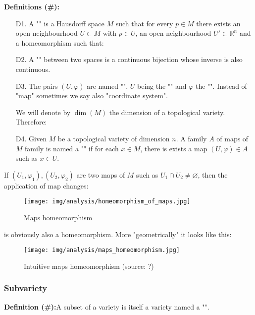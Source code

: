 	\textbf{Definitions (\#\mydef):}
	\begin{enumerate}
		\item[D1.] A "" is a Hausdorff space $M$ such that for every $p\in M$ there exists an open neighbourhood $U\subset M$ with $p\in U$, an open neighbourhood $U' \subset \mathbb{R}^n$ and a homeomorphism such that:
		
		\item[D2.] A "" between two spaces is a continuous bijection whose inverse is also continuous.

		\item[D3.] The pairs $(U,\varphi)$ are named "", $U$ being the "" and $\varphi$ the "". Instead of "map" sometimes we say also "coordinate system".

		\begin{tcolorbox}[title=Remark,colframe=black,arc=10pt]
		We will denote by $\dim(M)$ the dimension of a topological variety. Therefore:
		
		\end{tcolorbox}
	
		\item[D4.] Given $M$ be a topological variety of dimension $n$. A family $A$ of maps of $M$ family is named a  "" if for each $x\in M$, there is exists a map $(U, \varphi)\in A$ such as $x\in U$.
	\end{enumerate}
	If $(U_1,\varphi_1),(U_2,\varphi_2)$ are two maps of $M$ such as $U_1\cap U_2\neq \varnothing$, then the application of map changes:
	
	\begin{figure}[H]
		\centering
		\texttt{[image: img/analysis/homeomorphism\_of\_maps.jpg]}
		\caption{Maps homeomorphism}
	\end{figure}
	is obviously also a homeomorphism. More "geometrically" it looks like this:
	\begin{figure}[H]
		\centering
		\texttt{[image: img/analysis/maps\_homeomorphism.jpg]}
		\caption[Intuitive maps homeomorphism]{Intuitive maps homeomorphism (source: ?)}
	\end{figure}
	
	\pagebreak
	\subsubsection{Subvariety}
	\textbf{Definition (\#\mydef):}A subset of a variety is itself a variety named a "\label{subvariety}". 

